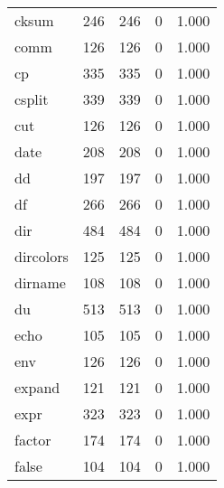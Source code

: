 \begin{longtable}{lp{4.5cm}p{4.5cm}p{4.5cm}p{4.5cm}}
cksum     &                     246 &              246 &                 0 &                        1.000 \\
comm      &                     126 &              126 &                 0 &                        1.000 \\
cp        &                     335 &              335 &                 0 &                        1.000 \\
csplit    &                     339 &              339 &                 0 &                        1.000 \\
cut       &                     126 &              126 &                 0 &                        1.000 \\
date      &                     208 &              208 &                 0 &                        1.000 \\
dd        &                     197 &              197 &                 0 &                        1.000 \\
df        &                     266 &              266 &                 0 &                        1.000 \\
dir       &                     484 &              484 &                 0 &                        1.000 \\
dircolors &                     125 &              125 &                 0 &                        1.000 \\
dirname   &                     108 &              108 &                 0 &                        1.000 \\
du        &                     513 &              513 &                 0 &                        1.000 \\
echo      &                     105 &              105 &                 0 &                        1.000 \\
env       &                     126 &              126 &                 0 &                        1.000 \\
expand    &                     121 &              121 &                 0 &                        1.000 \\
expr      &                     323 &              323 &                 0 &                        1.000 \\
factor    &                     174 &              174 &                 0 &                        1.000 \\
false     &                     104 &              104 &                 0 &                        1.000 \\

\end{longtable}
